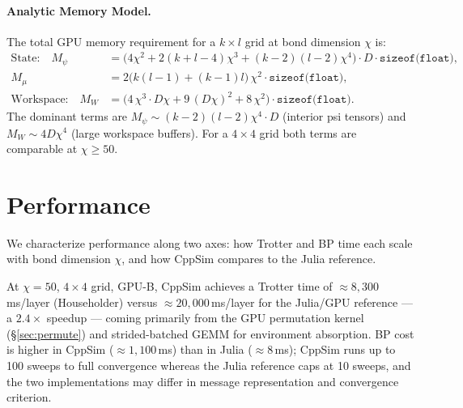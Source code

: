 \documentclass[11pt]{article}
\begin{document}
\paragraph{Analytic Memory Model.}
\label{sec:memory_model}

The total GPU memory requirement for a $k \times l$ grid at bond dimension $\chi$ is:
\begin{align}
 \text{State:}\quad
 M_\psi &= \bigl(4\chi^2 + 2(k+l-4)\chi^3 + (k-2)(l-2)\chi^4\bigr)
 \cdot D \cdot \texttt{sizeof(float)}, \label{eq:mem_psi} \\
 M_\mu &= 2\bigl(k(l-1)+(k-1)l\bigr)\,\chi^2 \cdot \texttt{sizeof(float)},
 \label{eq:mem_msg} \\
 \text{Workspace:}\quad
 M_W &= \bigl(4\,\chi^3 \cdot D\chi + 9\,(D\chi)^2 + 8\,\chi^2\bigr)
 \cdot \texttt{sizeof(float)}.
 \label{eq:mem_ws}
\end{align}
The dominant terms are $M_\psi \sim (k-2)(l-2)\chi^4 \cdot D$ (interior psi tensors)
and $M_W \sim 4D\chi^4$ (large workspace buffers). For a $4\times4$ grid both terms
are comparable at $\chi \geq 50$.



\section{Performance}
\label{sec:performance}

We characterize performance along two axes: how Trotter and BP time each scale
with bond dimension $\chi$, and how CppSim compares to the Julia reference.

At $\chi=50$, $4\times4$ grid, GPU-B, CppSim achieves a Trotter time of
$\approx 8{,}300$\,ms/layer (Householder) versus $\approx 20{,}000$\,ms/layer
for the Julia/GPU reference --- a $\mathbf{2.4\times}$ speedup --- coming
primarily from the GPU permutation kernel (\S\ref{sec:permute}) and
strided-batched GEMM for environment absorption.
BP cost is higher in CppSim ($\approx 1{,}100$\,ms) than in Julia
($\approx 8$\,ms); CppSim runs up to 100 sweeps to full convergence
whereas the Julia reference caps at 10 sweeps, and the two implementations
may differ in message representation and convergence criterion.
\end{document}
